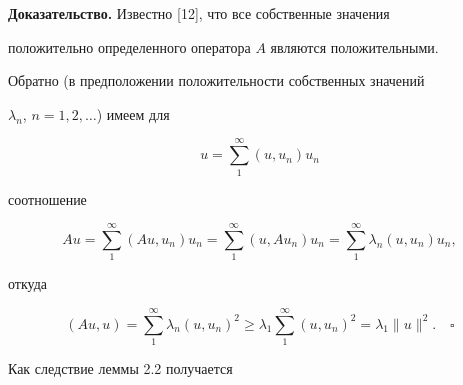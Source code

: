  


{\bf Доказательство.} Известно [12], что все собственные значения 


положительно определенного оператора $A$ являются положительными. 


 


Обратно (в предположении положительности собственных значений 


$\lambda_n$, $n=1,2,\dotsc$) имеем для 


$$ 


u=\sum^\infty_1(u,u_n)u_n


$$ 


соотношение 


$$ 


Au=\sum^\infty_1(Au,u_n)u_n=\sum^\infty_1(u,Au_n)u_n= 


\sum^\infty_1\lambda_n(u,u_n)u_n, 


$$ 


откуда 


$$ 


(Au,u)=\sum^\infty_1\lambda_n(u,u_n)^2\ge 


\lambda_1\sum^\infty_1(u,u_n)^2=\lambda_1\|u\|^2. 


\quad\square 


$$ 


 


Как следствие леммы 2.2 получается 


 


